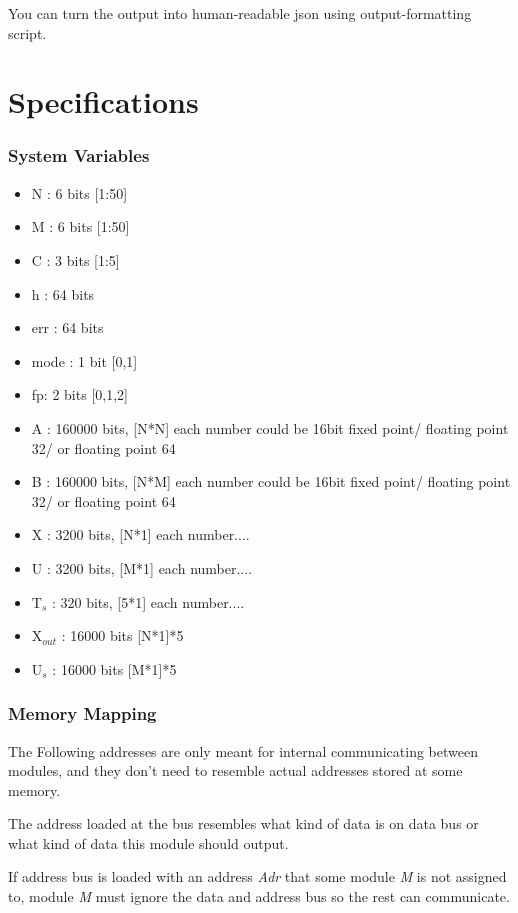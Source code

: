 \documentclass[12pt]{report}
\begin{document}
You can turn the output into human-readable json using output-formatting script.

\part{Specifications}

\section{System Variables}
\begin{itemize}
    \item N : 6 bits [1:50]
    \item M : 6 bits [1:50]
    \item C : 3 bits [1:5]
    \item h : 64 bits
    \item err : 64 bits
    \item mode : 1 bit [0,1]
    \item fp: 2 bits [0,1,2]
    \item A : 160000 bits, [N*N] each number could be 16bit fixed point/ floating point 32/ or floating point 64
    \item B : 160000 bits, [N*M] each number could be 16bit fixed point/ floating point 32/ or floating point 64
    \item X : 3200 bits, [N*1] each number....
    \item U : 3200 bits, [M*1] each number....
    \item T$_{s}$ : 320 bits, [5*1] each number....
    \item X$_{out}$ : 16000 bits [N*1]*5
    \item U$_s$ : 16000 bits [M*1]*5
\end{itemize}

\section{Memory Mapping}
The Following addresses are only meant for internal communicating between modules, and they don't need to resemble actual addresses stored at some memory. 

The address loaded at the bus resembles what kind of data is on data bus or what kind of data this module should output.

If address bus is loaded with an address \emph{Adr} that some module \emph{M} is not assigned to, module \emph{M} must ignore the data and address bus so the rest can communicate.
\end{document}
